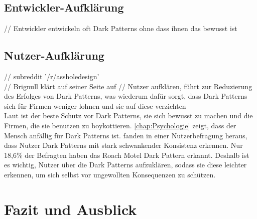 \documentclass[conference,compsoc,final,a4paper]{IEEEtran}
\begin{document}
\subsection{Entwickler-Aufklärung}
// Entwickler entwickeln oft Dark Patterns ohne dass ihnen das bewusst ist
\subsection{Nutzer-Aufklärung}
// subreddit '/r/assholedesign' \autocite{Chivukula_2019}\\
// Brignull klärt auf seiner Seite auf \autocite{Brignull}
// Nutzer aufklären, führt zur Reduzierung des Erfolges von Dark Patterns, was wiederum dafür sorgt, dass Dark Patterns sich für Firmen weniger lohnen und sie auf diese verzichten\\
Laut \citeauthor{Brignull} \autocite{Brignull} ist der beste Schutz vor Dark Patterns, sie sich bewusst zu machen und die Firmen, die sie benutzen zu boykottieren. \autoref{chap:Psychologie} zeigt, dass der Mensch anfällig für Dark Patterns ist. \citeauthor{M.Bhoot2020} \autocite{M.Bhoot2020} fanden in einer Nutzerbefragung heraus, dass Nutzer Dark Patterns mit stark schwankender Konsistenz erkennen. Nur 18,6\% der Befragten haben das Roach Motel Dark Pattern erkannt. Deshalb ist es wichtig, Nutzer über die Dark Patterns aufzuklären, sodass sie diese leichter erkennen, um sich selbst vor ungewollten Konsequenzen zu schützen.

\section{Fazit und Ausblick}

\printbibliography
\end{document}
